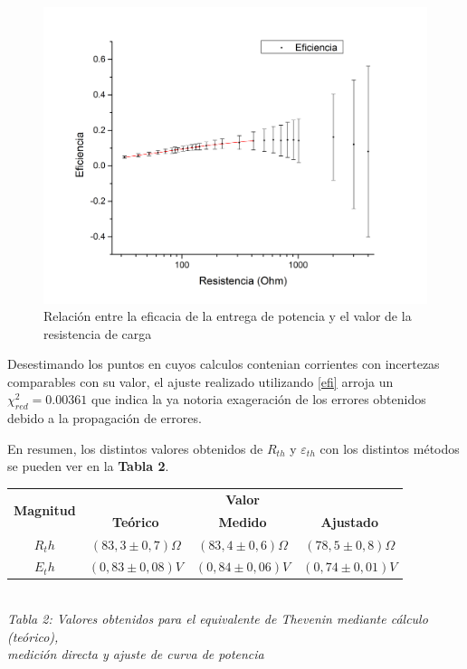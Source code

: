 \documentclass[11pt,a4paper]{article}
\begin{document}
\begin{figure}[h]
  \centering
  \includegraphics[scale=0.4]{Eficiencia_vs_Resistencia}
  \caption{Relación entre la eficacia de la entrega de potencia y el valor de la resistencia de carga}
  \label{fig:efi_res}
\end{figure}

Desestimando los puntos en cuyos calculos contenian corrientes con incertezas comparables con su valor, el ajuste realizado utilizando \eqref{efi} arroja un $\chi_{red}^{2} = 0.00361$ que indica la ya notoria exageración de los errores obtenidos debido a la propagación de errores.  

En resumen, los distintos valores obtenidos de $R_{th}$ y $\varepsilon_{th}$ con los distintos métodos se pueden ver en la \textbf{Tabla 2}.

\begin{center}
\begin{tabular}{||c|c|c|c||}
\hline
\multirow{2}{*}{\textbf{Magnitud}} & \multicolumn{3}{c||}{\textbf{Valor}} \\ \cline{2-4}
  & \textbf{Teórico} & \textbf{Medido} & \textbf{Ajustado} \\ \hline
$R_th$ & $(83,3\pm0,7)\Omega$ & $(83,4\pm0,6)\Omega$ & $(78,5\pm0,8)\Omega$ \\ \hline
$E_th$ & $(0,83\pm0,08)V$ & $(0,84\pm0,06)V$ & $(0,74\pm0,01)V$ \\ \hline
\end{tabular}\\[0.5cm]
\textit{Tabla 2: Valores obtenidos para el equivalente de Thevenin mediante cálculo (teórico),\\ medición directa y ajuste de curva de potencia}
\end{center}
\end{document}
